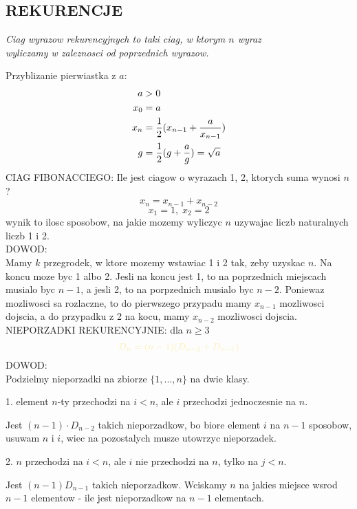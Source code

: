 \documentclass{article}
\begin{document}
\subsection*{REKURENCJE}
    \begin{center}
        \emph{\color{emp}Ciag wyrazow rekurencyjnych to taki ciag, w ktorym $n$ wyraz \\wyliczamy w zaleznosci od poprzednich wyrazow.}
    \end{center}
    Przyblizanie pierwiastka z $a$:
    \begin{align*}
        a&>0\\x_0&=a\\
        x_n&={1\over2}(x_{n-1}+{a\over x_{n-1}})\\
        g&=\frac12(g+\frac{a}{g})=\sqrt{a}\bigskip
    \end{align*}
    \color{def}CIAG FIBONACCIEGO\color{txt}: Ile jest ciagow o wyrazach 1, 2, ktorych suma wynosi $n$?
    $$x_n=x_{n-1}+x_{n-2}$$
    $$x_1=1,\;x_2=2$$
    wynik to ilosc sposobow, na jakie mozemy wyliczyc $n$ uzywajac liczb naturalnych liczb 1 i 2.\medskip\\
    \color{emp}DOWOD:\color{txt}\medskip\\
    Mamy \color{acc}$k$ przegrodek\color{txt}, w ktore mozemy wstawiac 1 i 2 tak, zeby uzyskac $n$. Na koncu moze byc  1 albo 2. Jesli na koncu jest 1, to na poprzednich miejscach musialo byc $n-1$, a jesli 2, to na porpzednich musialo byc $n-2$. Poniewaz mozliwosci sa rozlaczne, to do pierwszego przypadu mamy \color{acc}$x_{n-1}$ mozliwosci dojscia, a do przypadku z 2 na kocu, mamy $x_{n-2}$ \color{txt}mozliwosci dojscia.\bigskip\\
    \color{def}NIEPORZADKI REKURENCYJNIE\color{txt}: dla $n\geq 3$
    $$\color{acc}D_n=(n-1)(D_{n-2}+D_{n-1})$$
    \color{emp}DOWOD\color{txt}:\medskip\\
    Podzielmy nieporzadki na zbiorze $\{1, ..., n\}$ na dwie klasy.\smallskip\par
        \color{tit}1. \color{txt}element $n$-ty przechodzi na $i<n$, ale $i$ przechodzi jednoczesnie na $n$.\par
        Jest $(n-1)\cdot D_{n-2}$ takich nieporzadkow, bo biore element $i$ na $n-1$ sposobow, usuwam $n$ i $i$, wiec na pozostalych musze utowrzyc nieporzadek.\par
        \color{tit}2. \color{txt}$n$ przechodzi na $i<n$, ale $i$ nie przechodzi na $n$, tylko na $j<n$. \par
        Jest $(n-1)D_{n-1}$ takich nieporzadkow. \color{tit}Wciskamy $n$ na jakies miejsce wsrod $n-1$ elementow \color{txt}- ile jest nieporzadkow na $n-1$ elementach.\smallskip\\
\end{document}
